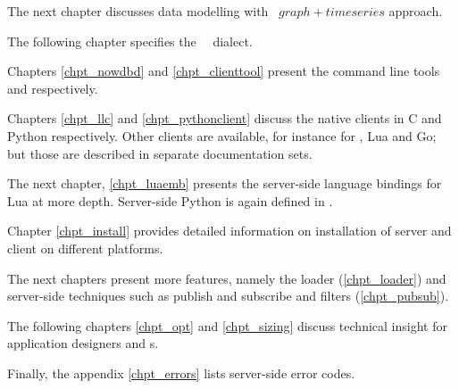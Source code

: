The next chapter discusses data modelling with
\nowdb\ $graph+timeseries$ approach.

The following chapter specifies the \nowdb\ \sql\ dialect.

Chapters \ref{chpt_nowdbd} and \ref{chpt_clienttool}
present the command line tools 
and  respectively.

Chapters \ref{chpt_llc} and \ref{chpt_pythonclient}
discuss the native clients in C and Python respectively.
Other clients are available, for instance for
\CC, Lua and Go; but those are described in separate
documentation sets.

The next chapter, \ref{chpt_luaemb} presents the server-side
language bindings for Lua at more depth. Server-side Python
is again defined in .

Chapter \ref{chpt_install} provides detailed information
on installation of server and client on different
platforms.

The next chapters present more features,
namely the loader (\ref{chpt_loader}) and
server-side techniques such as publish and subscribe and
filters (\ref{chpt_pubsub}).

The following chapters 
\ref{chpt_opt} and \ref{chpt_sizing}
discuss technical insight
for application designers and s.

Finally, the appendix \ref{chpt_errors} lists server-side
error codes.

